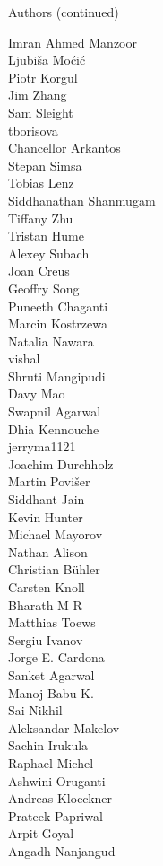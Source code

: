 \begin{frame}{Authors (continued)}
\begin{multicols}{5}
Imran Ahmed Manzoor\\
Ljubiša Moćić\\
Piotr Korgul\\
Jim Zhang\\
Sam Sleight\\
tborisova\\
Chancellor Arkantos\\
Stepan Simsa\\
Tobias Lenz\\
Siddhanathan Shanmugam\\
Tiffany Zhu\\
Tristan Hume\\
Alexey Subach\\
Joan Creus\\
Geoffry Song\\
Puneeth Chaganti\\
Marcin Kostrzewa\\
Natalia Nawara\\
vishal\\
Shruti Mangipudi\\
Davy Mao\\
Swapnil Agarwal\\
Dhia Kennouche\\
jerryma1121\\
Joachim Durchholz\\
Martin Povišer\\
Siddhant Jain\\
Kevin Hunter\\
Michael Mayorov\\
Nathan Alison\\
Christian Bühler\\
Carsten Knoll\\
Bharath M R\\
Matthias Toews\\
Sergiu Ivanov\\
Jorge E. Cardona\\
Sanket Agarwal\\
Manoj Babu K.\\
Sai Nikhil\\
Aleksandar Makelov\\
Sachin Irukula\\
Raphael Michel\\
Ashwini Oruganti\\
Andreas Kloeckner\\
Prateek Papriwal\\
Arpit Goyal\\
Angadh Nanjangud\\

\end{multicols}
\end{frame}
